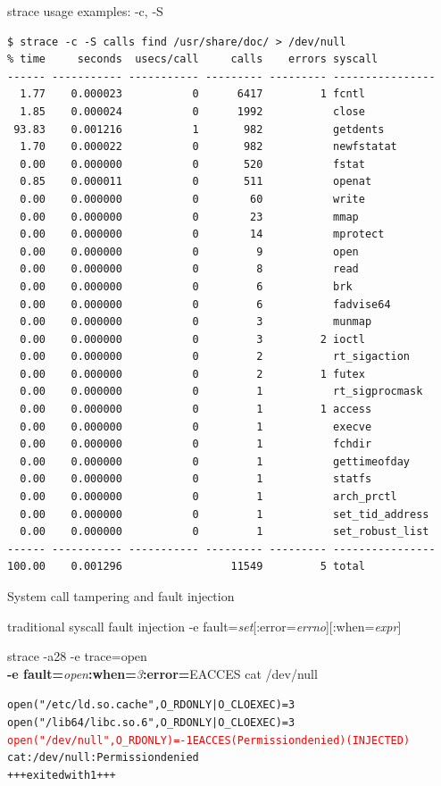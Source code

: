 \documentclass[unicode,aspectratio=169]{beamer}
\begin{document}
\begin{frame}[fragile]{strace usage examples: -c, -S}
\tiny
\begin{verbatim}
$ strace -c -S calls find /usr/share/doc/ > /dev/null
% time     seconds  usecs/call     calls    errors syscall
------ ----------- ----------- --------- --------- ----------------
  1.77    0.000023           0      6417         1 fcntl
  1.85    0.000024           0      1992           close
 93.83    0.001216           1       982           getdents
  1.70    0.000022           0       982           newfstatat
  0.00    0.000000           0       520           fstat
  0.85    0.000011           0       511           openat
  0.00    0.000000           0        60           write
  0.00    0.000000           0        23           mmap
  0.00    0.000000           0        14           mprotect
  0.00    0.000000           0         9           open
  0.00    0.000000           0         8           read
  0.00    0.000000           0         6           brk
  0.00    0.000000           0         6           fadvise64
  0.00    0.000000           0         3           munmap
  0.00    0.000000           0         3         2 ioctl
  0.00    0.000000           0         2           rt_sigaction
  0.00    0.000000           0         2         1 futex
  0.00    0.000000           0         1           rt_sigprocmask
  0.00    0.000000           0         1         1 access
  0.00    0.000000           0         1           execve
  0.00    0.000000           0         1           fchdir
  0.00    0.000000           0         1           gettimeofday
  0.00    0.000000           0         1           statfs
  0.00    0.000000           0         1           arch_prctl
  0.00    0.000000           0         1           set_tid_address
  0.00    0.000000           0         1           set_robust_list
------ ----------- ----------- --------- --------- ----------------
100.00    0.001296                 11549         5 total
\end{verbatim}
\end{frame}

\begin{frame}[fragile]{System call tampering and fault injection}
\begin{block}{\large traditional syscall fault injection}
-e fault=\textit{set}[:error=\textit{errno}][:when=\textit{expr}]
\end{block}
\begin{block}{\large strace -a28 -e trace=open \\ {\bf -e fault=}{\it open}{\bf :when=}{\it 3}{\bf :error=}{\sc EACCES} cat /dev/null}
\begin{alltt}
open("/etc/ld.so.cache", O_RDONLY|O_CLOEXEC) = 3
open("/lib64/libc.so.6", O_RDONLY|O_CLOEXEC) = 3
\textcolor{red}{open("/dev/null", O_RDONLY) = -1 EACCES (Permission denied) (INJECTED)}
cat: /dev/null: Permission denied
+++ exited with 1 +++
\end{alltt}
\end{block}
\end{frame}
\end{document}
